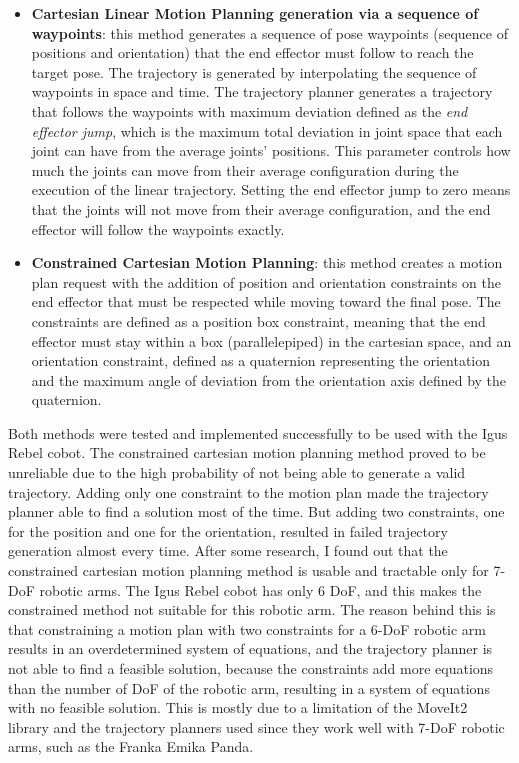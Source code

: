 \begin{itemize}
    \item \textbf{Cartesian Linear Motion Planning generation via a sequence of waypoints}:
    this method generates a sequence of pose waypoints (sequence of positions and orientation) that the
    end effector must follow to reach the target pose. The trajectory is generated by interpolating
    the sequence of waypoints in space and time. The trajectory planner generates a trajectory that
    follows the waypoints with maximum deviation defined as the \textit{end effector jump}, which is
    the maximum total deviation in joint space that each joint can have from the average joints' positions.
    This parameter controls how much the joints can move from their average configuration during the 
    execution of the linear trajectory. Setting the end effector jump to zero means that the joints
    will not move from their average configuration, and the end effector will follow the waypoints
    exactly.
    \item \textbf{Constrained Cartesian Motion Planning}: this method creates a motion plan request with the
    addition of position and orientation constraints on the end effector that must be respected while moving
    toward the final pose. The constraints are defined as a position box constraint, meaning that the end 
    effector must stay within a box (parallelepiped) in the cartesian space, and an orientation constraint,
    defined as a quaternion representing the orientation and the maximum angle of deviation from the
    orientation axis defined by the quaternion.
\end{itemize}

Both methods were tested and implemented successfully to be used with the Igus Rebel cobot.
The constrained cartesian motion planning method proved to be unreliable due to the high probability
of not being able to generate a valid trajectory. Adding only one constraint to the motion plan made
the trajectory planner able to find a solution most of the time. But adding two constraints, one for 
the position and one for the orientation, resulted in failed trajectory generation almost every time.
After some research, I found out that the constrained cartesian motion planning method is usable and 
tractable only for 7-DoF robotic arms. The Igus Rebel cobot has only 6 DoF, and this makes the constrained
method not suitable for this robotic arm. The reason behind this is that constraining a motion plan 
with two constraints for a 6-DoF robotic arm results in an overdetermined system of equations, and the
trajectory planner is not able to find a feasible solution, because the constraints add more equations 
than the number of DoF of the robotic arm, resulting in a system of equations with no feasible solution.
This is mostly due to a limitation of the MoveIt2 library and the trajectory planners used since they
work well with 7-DoF robotic arms, such as the Franka Emika Panda.

